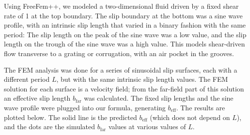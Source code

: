 \documentclass[a4paper]{report}
\newcommand{\beff}{\ensuremath{b_{\mathrm{eff}}}}
\newcommand{\bfar}{\ensuremath{b_{\mathrm{far}}}}
\begin{document}
Using FreeFem++, we modeled a two-dimensional fluid driven by a fixed shear rate of 1 at the top boundary.  The slip boundary at the bottom was a sine wave profile, with an intrinsic slip length that varied in a binary fashion with the same period: The slip length on the peak of the sine wave was a low value, and the slip length on the trough of the sine wave was a high value.  This models shear-driven flow transverse to a grating or corrugation, with an air pocket in the grooves. 
\begin{center}
\end{center}


The FEM analysis was done for a series of sinusoidal slip surfaces, each with a different period $L$, but with the same intrinsic slip length values.  The FEM solution for each surface is a velocity field; from the far-field part of this solution an effective slip length $\bfar$ was calculated.  The fixed slip lengths and the sine wave profile were plugged into our formula, generating $\beff$.  The results are plotted below.  The solid line is the predicted $\beff$ (which does not depend on $L$), and the dots are the simulated $\bfar$ values at various values of $L$.
\end{document}
